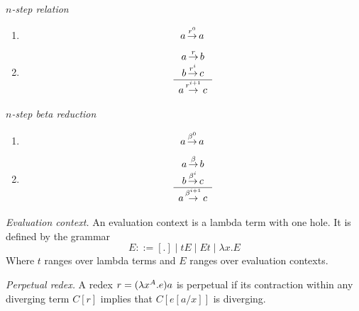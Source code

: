 \begin{definition}
    \emph{$n$-step relation}
    \begin{enumerate}
        \item $$ a {{\,\stackrel{{r}^{0}}{\to}\,}} a$$

        \item $$
            \begin{array}{c} 
                a {\,\stackrel{r}{\to}\,} b
                \\
                b {{\,\stackrel{{r}^{i}}{\to}\,}} c
             \\ \hline 
                a {{\,\stackrel{{r}^{i+1}}{\to}\,}} c
            \end{array}
            $$
    \end{enumerate}
\end{definition}






\begin{definition}
    \emph{$n$-step beta reduction}
    \begin{enumerate}
        \item $$ a {{{\,\stackrel{{\beta}^{0}}{\to}\,}}} a$$

        \item $$
            \begin{array}{c} 
                a {\,\stackrel{\beta}{\to}\,} b
                \\
                b {{{\,\stackrel{{\beta}^{i}}{\to}\,}}} c
             \\ \hline 
                a {{{\,\stackrel{{\beta}^{i+1}}{\to}\,}}} c
            \end{array}
            $$
    \end{enumerate}
\end{definition}




\begin{definition}
    \emph{Evaluation context.} An evaluation context is a lambda term with one
    hole. It is defined by the grammar
    $$
    E ::= [.] \mid t E \mid E t \mid \lambda x. E
    $$
    Where $t$ ranges over lambda terms and $E$ ranges over evaluation contexts.
\end{definition}




\begin{definition}
    \emph{Perpetual redex.}
    A redex $r = {(\lambda x^{A}. e) a}$ is perpetual if its contraction within any
    diverging term $C[r]$ implies that $C[e[a/x]]$ is diverging.
\end{definition}




